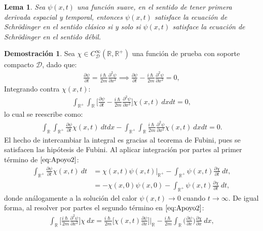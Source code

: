 \documentclass[12pt]{article}
\newtheorem{lem}[teo]{Lema}
\theoremstyle{definition}
\newtheorem*{demo}{Demostración}
\newcommand*{\field}[1]{\mathbb{#1}}
\begin{document}
\begin{lem}
    Sea $\psi(x,t)$ una función suave, en el sentido de tener primera derivada espacial y temporal, entonces $\psi(x,t)$ satisface la ecuación de Schrödinger en el sentido clásico si y solo si $\psi(x,t)$ satisface la ecuación de Schrödinger en el sentido débil.
\end{lem}
    \begin{demo}
        Sea $\chi \in C^{\infty}_{\mathcal{D}}(\field{R},\field{R}^{+})$ una función de prueba con soporte compacto $\mathcal{D}$, dado que:
        \begin{align*}
            \frac{\partial\psi}{\partial t} = \frac{i\hslash}{2m}\frac{\partial^2\psi}{\partial x^2} \implies
            \frac{\partial\psi}{\partial t} -
            \frac{i\hslash}{2m}\frac{\partial^2\psi}{\partial x^2}  = 0,
        \end{align*}
        Integrando contra $\chi(x,t)$:
        \begin{align*}
           \int_{\field{R}^+}\int_{\field{R}}\bigg[\frac{\partial\psi}{\partial t} -\frac{i\hslash}{2m}\frac{\partial^2\psi}{\partial x^2}\bigg]\chi(x,t) \:dxdt = 0,
        \end{align*}
        lo cual se reescribe como:
        \begin{align} \int_{\field{R}}\int_{\field{R}^+}\frac{\partial\psi}{\partial t}\chi(x,t) \: dtdx - \int_{\field{R}^+}\int_{\field{R}}\frac{i\hslash}{2m}\frac{\partial^2\psi}{\partial x^2}\chi(x,t) \:dxdt = 0.
        \label{eq:Apoyo2}  \end{align}
        El hecho de intercambiar la integral es gracias al teorema de Fubini, pues se satisfacen las hipótesis de Fubini. 
        Al aplicar integración por partes al primer término de $\eqref{eq:Apoyo2}$:
        \begin{align*}
            \int_{\field{R}^+}\frac{\partial\psi}{\partial t}\chi(x,t) \: dt & = \chi(x,t)\psi(x,t)\Big|_{\field{R}^+} - \int_{\field{R}^+}\psi(x,t)\frac{\partial\chi}{\partial t} \: dt,
            \\
            & = -\chi(x,0)\psi(x,0) - \int_{\field{R}^+}\psi(x,t)\frac{\partial\chi}{\partial t} \: dt,
        \end{align*}
        donde análogamente a la solución del calor $\psi(x,t) \rightarrow 0$ cuando $t \rightarrow \infty$. De igual forma, al resolver por partes el segundo término en $\eqref{eq:Apoyo2}$: \begin{align*} \int_{\field{R}}\bigg[\frac{i\hslash}{2m}\frac{\partial^2\psi}{\partial x^2}\bigg]\chi \: dx = \frac{i\hslash}{2m}\bigg[\chi(x,t)\frac{\partial\psi}{\partial x}\bigg]\Big|_{\field{R}} - \frac{i\hslash}{2m} \int_{\field{R}}\bigg(\frac{\partial\psi}{\partial x} \bigg)\frac{\partial \chi}{\partial x} \: dx,

\end{align*}
\end{demo}
\end{document}
